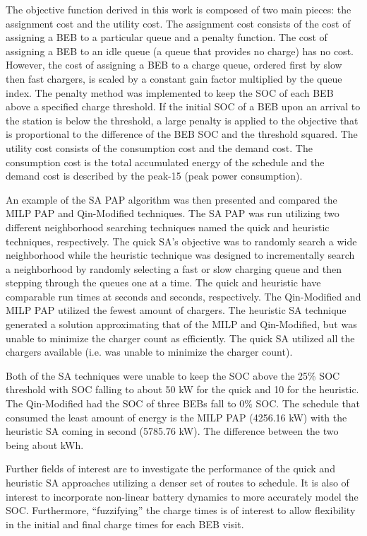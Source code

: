 \documentclass[11pt,a4paper,final]{article}
\newcommand{\tempcnt}{9101 }                                                    %
\newcommand{\quicklocal}{0.25 }                                                %
\newcommand{\heuristiclocal}{0.4 }                                             %
\begin{document}
The objective function derived in this work is composed of two main pieces: the assignment cost and the utility cost.
The assignment cost consists of the cost of assigning a BEB to a particular queue and a penalty function. The cost of
assigning a BEB to an idle queue (a queue that provides no charge) has no cost. However, the cost of assigning a BEB to
a charge queue, ordered first by slow then fast chargers, is scaled by a constant gain factor multiplied by the queue
index. The penalty method was implemented to keep the SOC of each BEB above a specified charge threshold. If the initial
SOC of a BEB upon an arrival to the station is below the threshold, a large penalty is applied to the objective that is
proportional to the difference of the BEB SOC and the threshold squared. The utility cost consists of the consumption
cost and the demand cost. The consumption cost is the total accumulated energy of the schedule and the demand cost is
described by the peak-15 (peak power consumption).

An example of the SA PAP algorithm was then presented and compared the MILP PAP and Qin-Modified techniques. The SA PAP
was run utilizing two different neighborhood searching techniques named the quick and heuristic techniques,
respectively. The quick SA's objective was to randomly search a wide neighborhood while the heuristic technique was
designed to incrementally search a neighborhood by randomly selecting a fast or slow charging queue and then stepping
through the queues one at a time. The quick and heuristic have comparable run times at \fpeval{\quicklocal * \tempcnt} seconds and \fpeval{\heuristiclocal * \tempcnt} seconds, respectively. The Qin-Modified and MILP
PAP utilized the fewest amount of chargers. The heuristic SA technique generated a solution approximating that of the
MILP and Qin-Modified, but was unable to minimize the charger count as efficiently. The quick SA utilized all the
chargers available (i.e. was unable to minimize the charger count).

Both of the SA techniques were unable to keep the SOC above the 25\% SOC threshold with SOC falling to about 50 kW for
the quick and 10 for the heuristic. The Qin-Modified had the SOC of three BEBs fall to 0\% SOC. The schedule that
consumed the least amount of energy is the MILP PAP (4256.16 kW) with the heuristic SA coming in second (5785.76 kW).
The difference between the two being about  kWh.

Further fields of interest are to investigate the performance of the quick and heuristic SA approaches utilizing a denser
set of routes to schedule. It is also of interest to incorporate non-linear battery dynamics to more accurately model
the SOC. Furthermore, ``fuzzifying'' the charge times is of interest to allow flexibility in the initial and final charge
times for each BEB visit.



\end{document}
